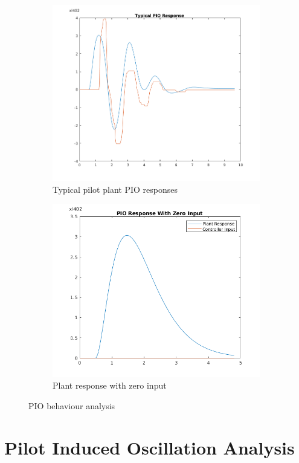 \documentclass{article}
\begin{document}
\begin{figure}
\centering
\begin{subfigure}{.5\textwidth}
  \centering
  \includegraphics[width=0.8\linewidth]{2_2_PIO_Response_With_Input.png}
	\caption{Typical pilot plant PIO responses}
	\label{fig:pio_response}
\end{subfigure}%
\begin{subfigure}{.5\textwidth}
  \centering
  \includegraphics[width=0.8\linewidth]{2_1_PIO_Response.png}
  \caption{Plant response with zero input}
  \label{fig:pio_no_input}
\end{subfigure}
\caption{PIO behaviour analysis}
\end{figure}


\section{Pilot Induced Oscillation Analysis}
\end{document}
